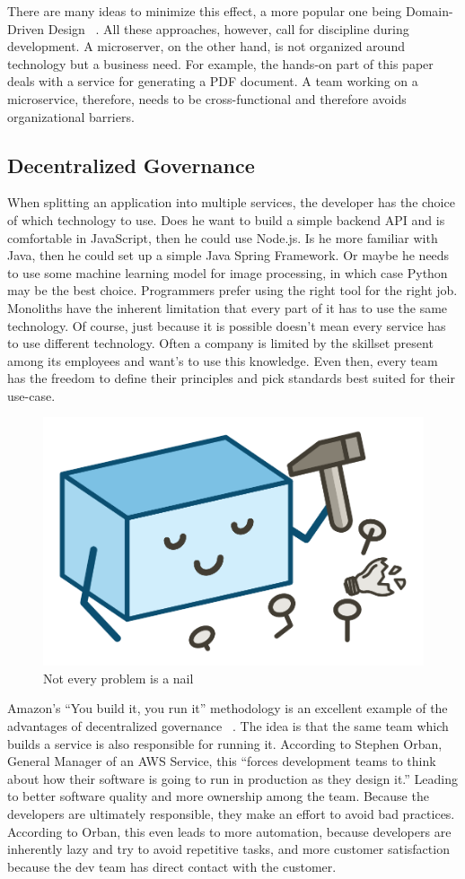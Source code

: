 There are many ideas to minimize this effect, a more popular one being Domain-Driven Design ~\cite{evans.2003}. All these approaches, however, call for discipline during development. A microserver, on the other hand, is not organized around technology but a business need. For example, the hands-on part of this paper deals with a service for generating a PDF document. A team working on a microservice, therefore, needs to be cross-functional and therefore avoids organizational barriers.


\subsection{Decentralized Governance}

When splitting an application into multiple services, the developer has the choice of which technology to use. Does he want to build a simple backend API and is comfortable in JavaScript, then he could use Node.js. Is he more familiar with Java, then he could set up a simple Java Spring Framework. Or maybe he needs to use some machine learning model for image processing, in which case Python may be the best choice. Programmers prefer using the right tool for the right job. Monoliths have the inherent limitation that every part of it has to use the same technology. Of course, just because it is possible doesn't mean every service has to use different technology. Often a company is limited by the skillset present among its employees and want's to use this knowledge. Even then, every team has the freedom to define their principles and pick standards best suited for their use-case.

\begin{figure}[ht]
  \centering
  \includegraphics[width=0.4\linewidth]{assets/illustration-monolith-hammer.png}
  \caption{Not every problem is a nail}
\end{figure}

Amazon's ``You build it, you run it'' methodology is an excellent example of the advantages of decentralized governance ~\cite{amazon.2015}. The idea is that the same team which builds a service is also responsible for running it. According to Stephen Orban, General Manager of an AWS Service, this ``forces development teams to think about how their software is going to run in production as they design it.'' Leading to better software quality and more ownership among the team. Because the developers are ultimately responsible,  they make an effort to avoid bad practices. According to Orban, this even leads to more automation, because developers are inherently lazy and try to avoid repetitive tasks, and more customer satisfaction because the dev team has direct contact with the customer.


